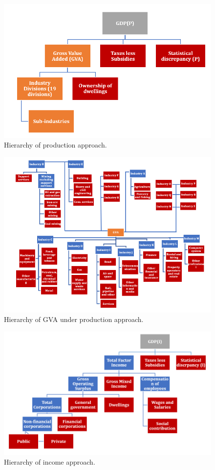 \documentclass[graybox]{svmult}
\begin{document}
\begin{figure}[H]
	\centering
	\small
	\includegraphics[scale=0.65]{Figs/GDP_P_fig1.PNG}
	\caption{Hierarchy of production approach.}\label{GDP_P_fig1}
\end{figure}

\begin{figure}[H]
	\centering
	\small
	\includegraphics[scale=1]{Figs/GDP_P_fig2.PNG}
	\caption{Hierarchy of GVA under production approach.}\label{GDP_P_fig2}
\end{figure}

\begin{figure}[H]
	\centering
	\small
	\includegraphics[scale=0.65]{Figs/GDP_I_fig1.PNG}
	\caption{Hierarchy of income approach.}\label{GDP_I_fig1}
\end{figure}
\end{document}
